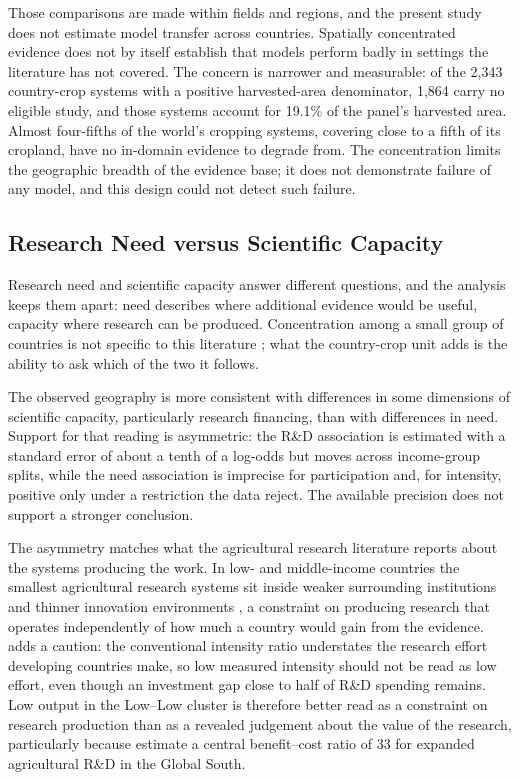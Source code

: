 \documentclass[ASNA,twocolumn]{USG}
\begin{document}
Those comparisons are made within fields and regions, and the present study does not estimate
model transfer across countries. Spatially concentrated evidence does not by itself establish
that models perform badly in settings the literature has not covered. The concern is narrower
and measurable: of the 2,343 country-crop systems with a positive harvested-area denominator,
1,864 carry no eligible study, and those systems account for 19.1\% of the panel's harvested
area. Almost four-fifths of the world's cropping systems, covering close to a fifth of its
cropland, have no in-domain evidence to degrade from. The concentration limits the geographic breadth of the evidence base; it does
not demonstrate failure of any model, and this design could not detect such failure.

\subsection{Research Need versus Scientific Capacity}

Research need and scientific capacity answer different questions, and the analysis keeps them
apart: need describes where additional evidence would be useful, capacity where research
can be produced. Concentration among a small group of countries is not specific to
this literature \cite{Bueno2025}; what the country-crop unit adds is the ability to ask
which of the two it follows.

The observed geography is more consistent with differences in some dimensions of scientific
capacity, particularly research financing, than with differences in need. Support for that reading is asymmetric: the R\&D association is estimated with a standard error
of about a tenth of a log-odds but moves across income-group splits, while the need association
is imprecise for participation and, for intensity, positive only under a restriction the data
reject. The available precision does not support a stronger conclusion.

The asymmetry matches what the agricultural research literature reports about the systems
producing the work. In low- and middle-income countries the smallest agricultural research systems sit inside
weaker surrounding institutions and thinner innovation environments \cite{NinPratt2023},
a constraint on producing research that operates independently of how much a country would
gain from the evidence.
\citet{NinPratt2021} adds a caution: the conventional intensity ratio understates the
research effort developing countries make, so low measured intensity should not be read as low
effort, even though an investment gap close to half of R\&D spending remains. Low output in the Low--Low cluster is therefore better read as a
constraint on research production than as a revealed judgement about the value of the
research, particularly because \citet{Rosegrant2023} estimate a central benefit--cost
ratio of 33 for expanded agricultural R\&D in the Global South.
\end{document}
